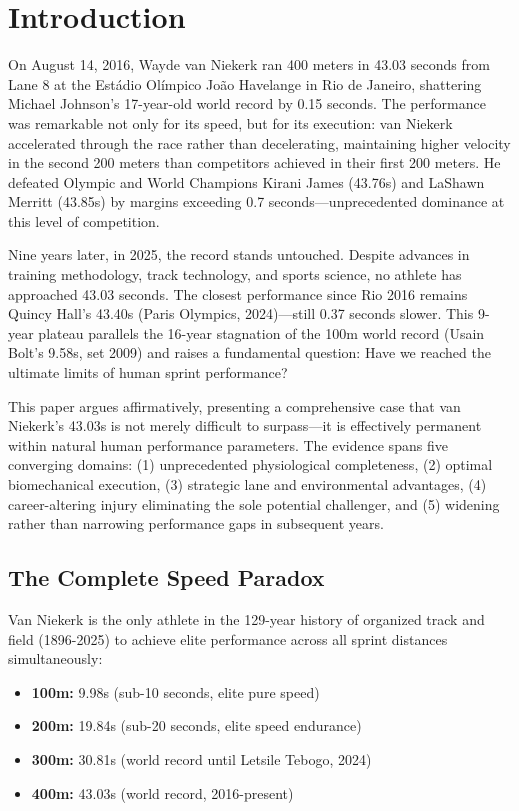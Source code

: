 \documentclass[twocolumn,10pt]{article}
\begin{document}
\section{Introduction}

On August 14, 2016, Wayde van Niekerk ran 400 meters in 43.03 seconds from Lane 8 at the Estádio Olímpico João Havelange in Rio de Janeiro, shattering Michael Johnson's 17-year-old world record by 0.15 seconds. The performance was remarkable not only for its speed, but for its execution: van Niekerk accelerated through the race rather than decelerating, maintaining higher velocity in the second 200 meters than competitors achieved in their first 200 meters. He defeated Olympic and World Champions Kirani James (43.76s) and LaShawn Merritt (43.85s) by margins exceeding 0.7 seconds—unprecedented dominance at this level of competition.

Nine years later, in 2025, the record stands untouched. Despite advances in training methodology, track technology, and sports science, no athlete has approached 43.03 seconds. The closest performance since Rio 2016 remains Quincy Hall's 43.40s (Paris Olympics, 2024)—still 0.37 seconds slower. This 9-year plateau parallels the 16-year stagnation of the 100m world record (Usain Bolt's 9.58s, set 2009) and raises a fundamental question: Have we reached the ultimate limits of human sprint performance?

This paper argues affirmatively, presenting a comprehensive case that van Niekerk's 43.03s is not merely difficult to surpass—it is effectively permanent within natural human performance parameters. The evidence spans five converging domains: (1) unprecedented physiological completeness, (2) optimal biomechanical execution, (3) strategic lane and environmental advantages, (4) career-altering injury eliminating the sole potential challenger, and (5) widening rather than narrowing performance gaps in subsequent years.

\subsection{The Complete Speed Paradox}

Van Niekerk is the only athlete in the 129-year history of organized track and field (1896-2025) to achieve elite performance across all sprint distances simultaneously:

\begin{itemize}
    \item \textbf{100m:} 9.98s (sub-10 seconds, elite pure speed)
    \item \textbf{200m:} 19.84s (sub-20 seconds, elite speed endurance)
    \item \textbf{300m:} 30.81s (world record until Letsile Tebogo, 2024)
    \item \textbf{400m:} 43.03s (world record, 2016-present)
\end{itemize}
\end{document}
